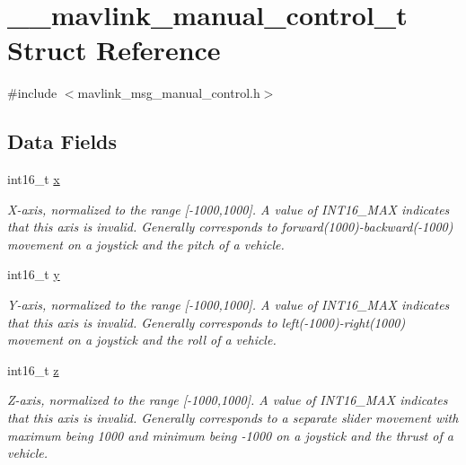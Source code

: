\hypertarget{struct____mavlink__manual__control__t}{\section{\+\_\+\+\_\+mavlink\+\_\+manual\+\_\+control\+\_\+t Struct Reference}
\label{struct____mavlink__manual__control__t}
}


{\ttfamily \#include $<$mavlink\+\_\+msg\+\_\+manual\+\_\+control.\+h$>$}

\subsection*{Data Fields}
\begin{DoxyCompactItemize}
\item 
int16\+\_\+t \hyperlink{struct____mavlink__manual__control__t_add34b2bd0b54651701e7d8b2912868a6}{x}
\begin{DoxyCompactList}\small\item\em X-\/axis, normalized to the range \mbox{[}-\/1000,1000\mbox{]}. A value of I\+N\+T16\+\_\+\+M\+A\+X indicates that this axis is invalid. Generally corresponds to forward(1000)-\/backward(-\/1000) movement on a joystick and the pitch of a vehicle. \end{DoxyCompactList}\item 
int16\+\_\+t \hyperlink{struct____mavlink__manual__control__t_a5f705735ffdbe9c373151fe73c0abedb}{y}
\begin{DoxyCompactList}\small\item\em Y-\/axis, normalized to the range \mbox{[}-\/1000,1000\mbox{]}. A value of I\+N\+T16\+\_\+\+M\+A\+X indicates that this axis is invalid. Generally corresponds to left(-\/1000)-\/right(1000) movement on a joystick and the roll of a vehicle. \end{DoxyCompactList}\item 
int16\+\_\+t \hyperlink{struct____mavlink__manual__control__t_a9e3fd9d9bcd622e31cca4d44f66343c1}{z}
\begin{DoxyCompactList}\small\item\em Z-\/axis, normalized to the range \mbox{[}-\/1000,1000\mbox{]}. A value of I\+N\+T16\+\_\+\+M\+A\+X indicates that this axis is invalid. Generally corresponds to a separate slider movement with maximum being 1000 and minimum being -\/1000 on a joystick and the thrust of a vehicle. \end{DoxyCompactList}\item 

\end{DoxyCompactItemize}
